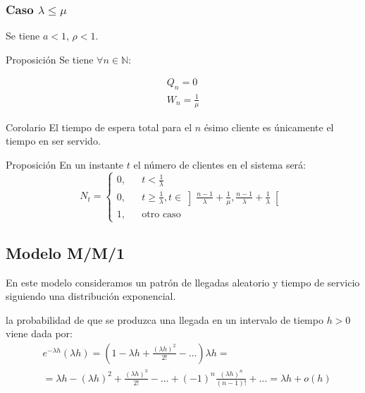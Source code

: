 \documentclass[8pt]{beamer}
\begin{document}
  \begin{frame}\frametitle{Caso $\lambda \le \mu$}
    Se tiene $a < 1$, $\rho < 1$.

    \begin{block}{Proposición}
Se tiene $\forall n\in \mathbb{N}$:

\begin{align*}
Q_n = 0\\
W_n = \frac{1}{\mu}
\end{align*}
    \end{block}

    \begin{block}{Corolario}
 El tiempo de espera total para el $n$ ésimo cliente es únicamente el tiempo en ser servido.
    \end{block}

    \begin{block}{Proposición}
 En un instante $t$ el número de clientes en el sistema será: 
 \[N_t = \left\{\begin{array}{lcc}
          0, && t < \frac{1}{\lambda}\\
          0, && t \ge \frac{1}{\lambda}, t \in \left]\frac{n-1}{\lambda} + \frac{1}{\mu}, \frac{n-1}{\lambda} + \frac{1}{\lambda}\right[\\
          1, && \text{otro caso}
         \end{array}\right.\]
    \end{block}
  \end{frame}

  \subsection{Modelo M/M/1}
  \begin{frame}En este modelo consideramos un patrón de llegadas aleatorio y tiempo de servicio siguiendo una distribución 
  	exponencial.
  \end{frame}

\begin{frame}
la probabilidad de que se produzca una llegada 
en un intervalo de tiempo $h>0$ viene dada por:
\begin{align*}
& e^{-\lambda h}(\lambda h)= \left(1-\lambda h+\frac{(\lambda h)^2}{2!}- \dots\right) \lambda h = \\
& =\lambda h-(\lambda h)^2+\frac{(\lambda h)^3}{2!}-\dots+(-1)^n\frac{(\lambda h)^n}{(n-1)!} + \ldots = \lambda h+o(h)
\end{align*}
\end{frame}
\end{document}
